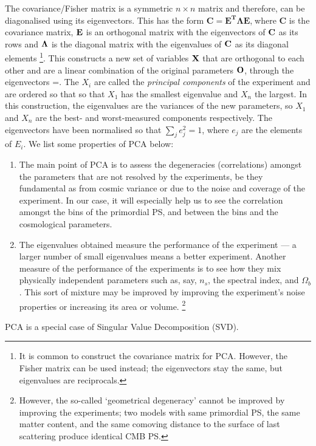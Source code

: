 {The covariance/Fisher matrix is a symmetric $n\times n$ matrix and therefore, can be diagonalised
using its eigenvectors. This has the form $\mathbf{C}=\mathbf{E^{T}}\mathbf{\Lambda}\mathbf{E}$,$\;$where
$\mathbf{C}$ is the covariance matrix, $\mathbf{{\normalcolor E}}$
is an orthogonal matrix with the eigenvectors of ${\normalcolor \mathbf{C}}$
as its rows and ${\normalcolor \mathbf{\Lambda}}$ is the diagonal
matrix with the eigenvalues of ${\normalcolor \mathbf{C}}$ as its
diagonal elements%
\footnote{It is common to construct the covariance matrix for PCA. However,
the Fisher matrix can be used instead; the eigenvectors stay the same, but
eigenvalues are reciprocals.%
}. This constructs a new set of variables $\mathbf{{\normalcolor X}}$
that are orthogonal to each other and are a linear combination of
the original parameters ${\normalcolor \mathbf{O}}$, through the eigenvectors
\setcounter{equation}{0}
\renewcommand{\theequation}{PCA.\arabic{equation}}
\be
{}=\;.
\ee
The $X_{i}$ are called the \emph{principal components} of the experiment
and are ordered so that so that $X_{1}$ has the smallest
eigenvalue and $X_{n}$ the largest. In this construction, the eigenvalues
are the variances of the new parameters, so $X_{1}$ and $X_{n}$ are the best- and worst-measured components respectively. The eigenvectors have
been normalised so that $\sum_{j}e_{j}^{2}=1$, where $e_{j}$ are
the elements of $E_{i}$. We list some properties of PCA below:
\begin{enumerate}
\item The main point of PCA is to assess the degeneracies (correlations) amongst the parameters
that are not resolved by the experiments, be they fundamental as from 
cosmic variance or due to the noise and coverage of the experiment.
In our case, it will especially help us to see the correlation amongst
the bins of the primordial PS, and between the bins and the cosmological
parameters.
\item The eigenvalues obtained measure the performance of the experiment
--- a larger number of small eigenvalues means a better experiment.
Another measure of the performance of the experiments is to see how
they mix physically independent parameters such as, say, $n_{s}$,
the spectral index, and $\Omega_{b}$. This sort of mixture may be
improved by improving the experiment's noise properties or increasing its area or volume.%
\footnote{However, the so-called `geometrical degeneracy'
cannot be improved by improving the experiments; two models with
same primordial PS, the same matter content, and the same comoving
distance to the surface of last scattering produce identical CMB PS.%
}
\end{enumerate}
PCA is a special case of Singular Value Decomposition (SVD).
}%


